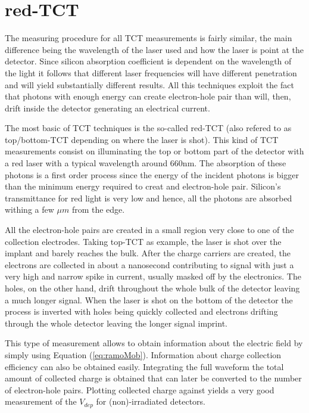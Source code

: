 \section{red-TCT} %
\label{sec:experimental_method}

The measuring procedure for all TCT measurements is fairly similar, the main difference being the wavelength of the laser used and how the laser is point at the detector. Since silicon absorption coefficient is dependent on the wavelength of the light it follows that different laser frequencies will have different penetration and will yield substantially different results. All this techniques exploit the fact that photons with enough energy can create electron-hole pair than will, then, drift inside the detector generating an electrical current. 

The most basic of TCT techniques is the so-called red-TCT (also refered to as top/bottom-TCT depending on where the laser is shot). This kind of TCT measurements consist on illuminating the top or bottom part of the detector with a red laser with a typical wavelength around 660nm. The absorption of these photons is a first order process since the energy of the incident photons is bigger than the minimum energy required to creat and electron-hole pair. Silicon's transmittance for red light is very low and hence, all the photons are absorbed withing a few $\mu m$ from the edge. 

All the electron-hole pairs are created in a small region very close to one of the collection electrodes. Taking top-TCT as example, the laser is shot over the implant and barely reaches the bulk. After the charge carriers are created, the electrons are collected in about a nanosecond contributing to signal with just a very high and narrow spike in current, usually masked off by the electronics. The holes, on the other hand, drift throughout the whole bulk of the detector leaving a much longer signal. When the laser is shot on the bottom of the detector the process is inverted with holes being quickly collected and electrons drifting through the whole detector leaving the longer signal imprint.

This type of measurement allows to obtain information about the electric field by simply using Equation (\ref{eq:ramoMob}). Information about charge collection efficiency can also be obtained easily. Integrating the full waveform the total amount of collected charge is obtained that can later be converted to the number of electron-hole pairs. Plotting collected charge against \vias yields a very good measurement of the $V_{dep}$ for (non)-irradiated detectors. 

